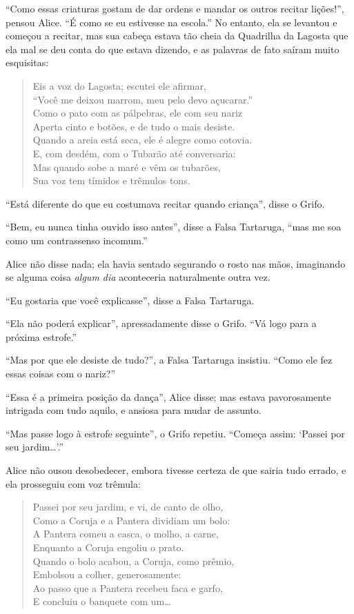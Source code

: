 ``Como essas criaturas gostam de dar ordens e mandar os outros recitar
lições!'', pensou Alice. ``É como se eu estivesse na escola.'' No
entanto, ela se levantou e começou a recitar, mas sua cabeça estava tão
cheia da Quadrilha da Lagosta que ela mal se deu conta do que estava
dizendo, e as palavras de fato saíram muito esquisitas:

\begin{quote}
Eis a voz do Lagosta; escutei ele afirmar,\\
``Você me deixou marrom, meu pelo devo açucarar.''\\
Como o pato com as pálpebras, ele com seu nariz\\
Aperta cinto e botões, e de tudo o mais desiste.\\
Quando a areia está seca, ele é alegre como cotovia.\\
E, com desdém, com o Tubarão até conversaria:\\
Mas quando sobe a maré e vêm os tubarões,\\
Sua voz tem tímidos e trêmulos tons.
\end{quote}

``Está diferente do que eu costumava recitar quando criança'', disse o
Grifo.

``Bem, eu nunca tinha ouvido isso antes'', disse a Falsa Tartaruga,
``mas me soa como um contrassenso incomum.''

Alice não disse nada; ela havia sentado segurando o rosto nas mãos,
imaginando se alguma coisa \emph{algum dia} aconteceria naturalmente
outra vez.

``Eu gostaria que você explicasse'', disse a Falsa Tartaruga.

``Ela não poderá explicar'', apressadamente disse o Grifo. ``Vá logo para a
próxima estrofe.''

``Mas por que ele desiste de tudo?'', a Falsa Tartaruga insistiu. ``Como
ele fez essas coisas com o nariz?''

``Essa é a primeira posição da dança'', Alice disse; mas estava
pavorosamente intrigada com tudo aquilo, e ansiosa para mudar de
assunto.

``Mas passe logo à estrofe seguinte'', o Grifo repetiu. ``Começa assim:
`Passei por seu jardim\ldots{}'.''

Alice não ousou desobedecer, embora tivesse certeza de que sairia tudo
errado, e ela prosseguiu com voz trêmula:

\begin{quote}
Passei por seu jardim, e vi, de canto de olho,\\
Como a Coruja e a Pantera dividiam um bolo:\\
A Pantera comeu a casca, o molho, a carne,\\
Enquanto a Coruja engoliu o prato.\\
Quando o bolo acabou, a Coruja, como prêmio,\\
Embolsou a colher, generosamente:\\
Ao passo que a Pantera recebeu faca e garfo,\\
E concluiu o banquete com um\ldots{}
\end{quote}

